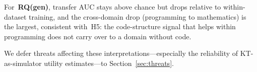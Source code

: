 For~\textbf{RQ(gen)}, transfer AUC stays above chance but drops relative
to within-dataset training, and the cross-domain drop (programming to
mathematics) is the largest, consistent with~H5: the code-structure
signal that helps within programming does not carry over to a domain
without code.

We defer threats affecting these interpretations---especially the
reliability of KT-as-simulator utility estimates---to
Section~\ref{sec:threats}.
